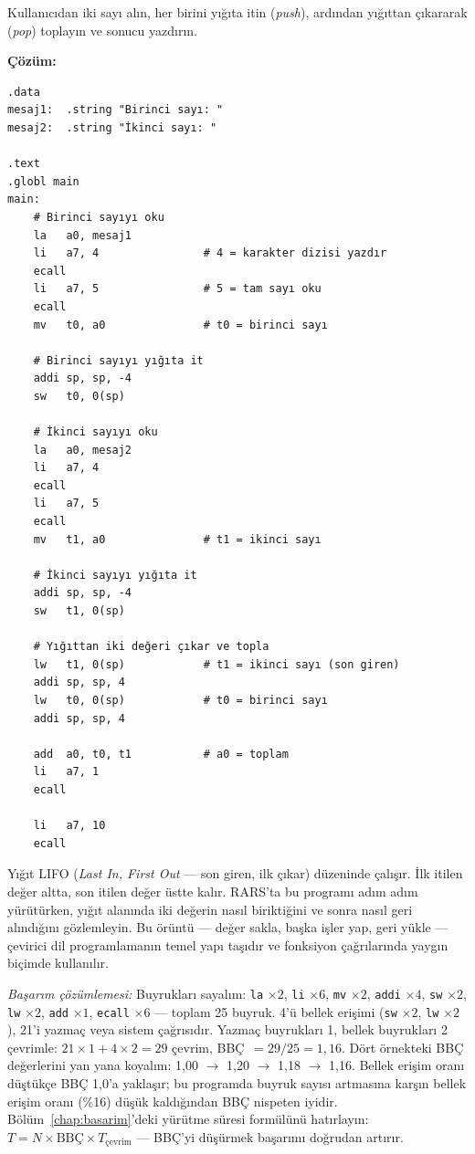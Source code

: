 \begin{ornek}[4.4]
\label{orn:yigit-toplama}
Kullanıcıdan iki sayı alın, her birini yığıta itin (\emph{push}), ardından yığıttan çıkararak (\emph{pop}) toplayın ve sonucu yazdırın.

\textbf{Çözüm:}

\begin{lstlisting}[style=riscv]
.data
mesaj1:  .string "Birinci sayı: "
mesaj2:  .string "İkinci sayı: "

.text
.globl main
main:
    # Birinci sayıyı oku
    la   a0, mesaj1
    li   a7, 4                # 4 = karakter dizisi yazdır
    ecall
    li   a7, 5                # 5 = tam sayı oku
    ecall
    mv   t0, a0               # t0 = birinci sayı

    # Birinci sayıyı yığıta it
    addi sp, sp, -4
    sw   t0, 0(sp)

    # İkinci sayıyı oku
    la   a0, mesaj2
    li   a7, 4
    ecall
    li   a7, 5
    ecall
    mv   t1, a0               # t1 = ikinci sayı

    # İkinci sayıyı yığıta it
    addi sp, sp, -4
    sw   t1, 0(sp)

    # Yığıttan iki değeri çıkar ve topla
    lw   t1, 0(sp)            # t1 = ikinci sayı (son giren)
    addi sp, sp, 4
    lw   t0, 0(sp)            # t0 = birinci sayı
    addi sp, sp, 4

    add  a0, t0, t1           # a0 = toplam
    li   a7, 1
    ecall

    li   a7, 10
    ecall
\end{lstlisting}

Yığıt LIFO (\emph{Last In, First Out} --- son giren, ilk çıkar) düzeninde çalışır. İlk itilen değer altta, son itilen değer üstte kalır. RARS'ta bu programı adım adım yürütürken, yığıt alanında iki değerin nasıl biriktiğini ve sonra nasıl geri alındığını gözlemleyin. Bu örüntü --- değer sakla, başka işler yap, geri yükle --- çevirici dil programlamanın temel yapı taşıdır ve fonksiyon çağrılarında yaygın biçimde kullanılır.

\emph{Başarım çözümlemesi:} Buyrukları sayalım: \texttt{la} $\times 2$, \texttt{li} $\times 6$, \texttt{mv} $\times 2$, \texttt{addi} $\times 4$, \texttt{sw} $\times 2$, \texttt{lw} $\times 2$, \texttt{add} $\times 1$, \texttt{ecall} $\times 6$ --- toplam 25 buyruk. 4'ü bellek erişimi (\texttt{sw} $\times 2$, \texttt{lw} $\times 2$), 21'i yazmaç veya sistem çağrısıdır. Yazmaç buyrukları 1, bellek buyrukları 2 çevrimle: $21 \times 1 + 4 \times 2 = 29$ çevrim, BBÇ~$= 29/25 = 1{,}16$. Dört örnekteki BBÇ değerlerini yan yana koyalım: 1{,}00 $\rightarrow$ 1{,}20 $\rightarrow$ 1{,}18 $\rightarrow$ 1{,}16. Bellek erişim oranı düştükçe BBÇ 1{,}0'a yaklaşır; bu programda buyruk sayısı artmasına karşın bellek erişim oranı (\%16) düşük kaldığından BBÇ nispeten iyidir. Bölüm~\ref{chap:basarim}'deki yürütme süresi formülünü hatırlayın: $T = N \times \text{BBÇ} \times T_{\text{çevrim}}$ --- BBÇ'yi düşürmek başarımı doğrudan artırır.
\end{ornek}

